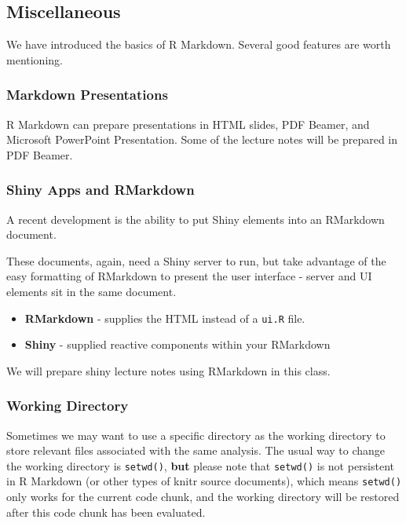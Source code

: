 \documentclass[
]{article}
\providecommand{\tightlist}{%
  \setlength{\itemsep}{0pt}\setlength{\parskip}{0pt}}
\begin{document}
\hypertarget{miscellaneous}{%
\subsection{Miscellaneous}\label{miscellaneous}}

We have introduced the basics of R Markdown. Several good features are
worth mentioning.

\hypertarget{markdown-presentations}{%
\subsubsection{Markdown Presentations}\label{markdown-presentations}}

R Markdown can prepare presentations in HTML slides, PDF Beamer, and
Microsoft PowerPoint Presentation. Some of the lecture notes will be
prepared in PDF Beamer.

\hypertarget{shiny-apps-and-rmarkdown}{%
\subsubsection{Shiny Apps and
RMarkdown}\label{shiny-apps-and-rmarkdown}}

A recent development is the ability to put Shiny elements into an
RMarkdown document.

These documents, again, need a Shiny server to run, but take advantage
of the easy formatting of RMarkdown to present the user interface -
server and UI elements sit in the same document.

\begin{itemize}
\tightlist
\item
  \textbf{RMarkdown} - supplies the HTML instead of a \texttt{ui.R}
  file.
\item
  \textbf{Shiny} - supplied reactive components within your RMarkdown
\end{itemize}

We will prepare shiny lecture notes using RMarkdown in this class.

\hypertarget{working-directory}{%
\subsubsection{Working Directory}\label{working-directory}}

Sometimes we may want to use a specific directory as the working
directory to store relevant files associated with the same analysis. The
usual way to change the working directory is \texttt{setwd()},
\textbf{but} please note that \texttt{setwd()} is not persistent in R
Markdown (or other types of knitr source documents), which means
\texttt{setwd()} only works for the current code chunk, and the working
directory will be restored after this code chunk has been evaluated.
\end{document}
